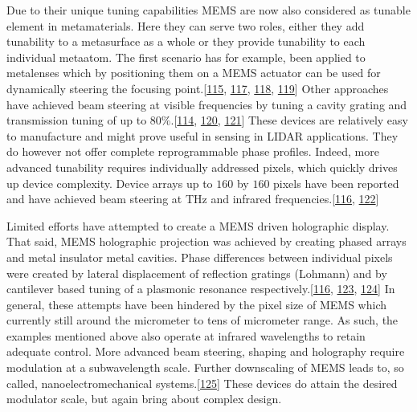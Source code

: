 \documentclass[a4paper,10pt,english,openany,oneside]{jupyterBook}
\begin{document}
\sphinxAtStartPar
Due to their unique tuning capabilities MEMS are now also considered as tunable element in metamaterials. Here they can serve two roles, either they add tunability to a metasurface as a whole or they provide tunability to each individual meta\sphinxhyphen{}atom. The first scenario has for example, been applied to metalenses which by positioning them on a MEMS actuator can be used for dynamically steering the focusing point.{[}\hyperlink{cite.bib:id277}{115}, \hyperlink{cite.bib:id368}{117}, \hyperlink{cite.bib:id146}{118}, \hyperlink{cite.bib:id279}{119}{]} Other approaches have achieved beam steering at visible frequencies by tuning a cavity grating and transmission tuning of up to \(80\%\).{[}\hyperlink{cite.bib:id68}{114}, \hyperlink{cite.bib:id418}{120}, \hyperlink{cite.bib:id289}{121}{]}
These devices are relatively easy to manufacture and might prove useful in sensing in LIDAR applications. They do however not offer complete reprogrammable phase profiles. Indeed, more advanced tunability requires individually addressed pixels, which quickly drives up device complexity. Device arrays up to \(160\) by \(160\) pixels have been reported and have achieved beam steering at THz and infrared frequencies.{[}\hyperlink{cite.bib:id37}{116}, \hyperlink{cite.bib:id39}{122}{]}

\sphinxAtStartPar
Limited efforts have attempted to create a MEMS driven holographic display.
That said, MEMS holographic projection was achieved by creating phased arrays and metal insulator metal cavities. Phase differences between individual pixels were created by lateral displacement of reflection gratings (Lohmann) and by cantilever based tuning of a plasmonic resonance respectively.{[}\hyperlink{cite.bib:id37}{116}, \hyperlink{cite.bib:id75}{123}, \hyperlink{cite.bib:id74}{124}{]}
In general, these attempts have been hindered by the pixel size of MEMS which currently still around the micrometer to tens of micrometer range. As such, the examples mentioned above also operate at infrared wavelengths to retain adequate control.  More advanced beam steering, shaping and holography require modulation at a subwavelength scale. Further downscaling of MEMS leads to, so called, nano\sphinxhyphen{}electromechanical systems.{[}\hyperlink{cite.bib:id303}{125}{]} These devices do attain the desired modulator scale, but again bring about complex design.

\sphinxstepscope
\end{document}

